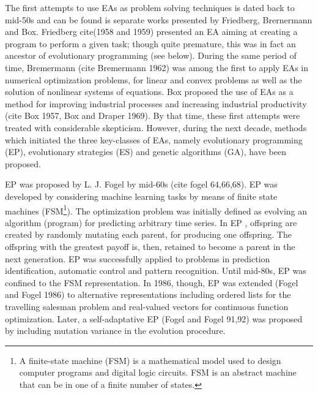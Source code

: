 The first attempts to use EAs as problem solving techniques is dated back to mid-50s and can be found is separate works presented by Friedberg, Brernermann and Box. Friedberg cite(1958 and 1959) presented an EA aiming at creating a program to perform a given task; though quite premature, this was in fact an ancestor of evolutionary programming (see below). During the same period of time, Bremermann (cite Bremermann 1962) was among the first to apply EAs in numerical optimization problems, for linear and convex problems as well as the solution of nonlinear systems of equations. Box proposed the use of EAs as a method for improving industrial processes and increasing industrial productivity (cite Box 1957, Box and Draper 1969). By that time, these first attempts were treated with considerable skepticism. However, during the next decade, methods which initiated the three key-classes of EAs, namely evolutionary programming (EP), evolutionary strategies (ES) and genetic algorithms (GA), have been proposed.

EP was proposed by L. J. Fogel by mid-60s  (cite fogel 64,66,68). EP was developed by considering machine learning tasks by means of finite state machines (FSM\footnote{A finite-state machine (FSM) is a mathematical model used to design computer programs and digital logic circuits. FSM is an abstract machine that can be in one of a finite number of states.}). The optimization problem was  initially defined as evolving an algorithm (program) for predicting arbitrary time series.  In EP  \cite{Fogel}, offspring are created by randomly mutating each parent, for producing one offspring. The offspring with the greatest payoff is, then, retained to become a parent in the next generation. EP was successfully applied to problems in prediction identification, automatic control and pattern recognition. Until mid-80s, EP was confined to the FSM representation. In 1986, though, EP was extended (Fogel and Fogel 1986) to alternative representations including ordered lists for the travelling salesman problem and real-valued vectors for continuous function optimization. Later, a self-adaptative EP (Fogel and Fogel 91,92) was proposed by including mutation variance in the evolution procedure.

